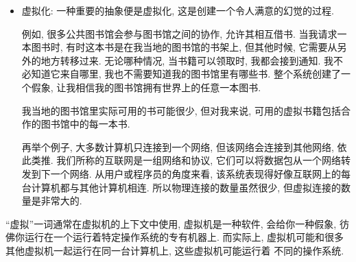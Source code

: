 \documentclass[12pt]{book}
\begin{document}
{\begin{itemize}
\item 虚拟化: 一种重要的抽象便是虚拟化, 这是创建一个令人满意的幻觉的过程.


例如, 很多公共图书馆会参与图书馆之间的协作, 允许其相互借书.
当我请求一本图书时, 有时这本书是在我当地的图书馆的书架上,
但其他时候, 它需要从另外的地方转移过来.
无论哪种情况, 当书籍可以领取时, 我都会接到通知.
我不必知道它来自哪里, 我也不需要知道我的图书馆里有哪些书.
整个系统创建了一个假象, 让我相信我的图书馆拥有世界上的任意一本图书.


我当地的图书馆里实际可用的书可能很少,
但对我来说, 可用的虚拟书籍包括合作的图书馆中的每一本书.

再举个例子, 大多数计算机只连接到一个网络, 
但该网络会连接到其他网络, 依此类推.
我们所称的互联网是一组网络和协议, 
它们可以将数据包从一个网络转发到下一个网络. 
从用户或程序员的角度来看, 
该系统表现得好像互联网上的每台计算机都与其他计算机相连. 
所以物理连接的数量虽然很少, 但虚拟连接的数量是非常大的.

\end{itemize}

``虚拟''一词通常在虚拟机的上下文中使用, 虚拟机是一种软件, 会给你一种假象,
彷佛你运行在一个运行着特定操作系统的专有机器上.
而实际上, 虚拟机可能和很多其他虚拟机一起运行在同一台计算机上, 这些虚拟机可能运行着
不同的操作系统.

}
\end{document}
